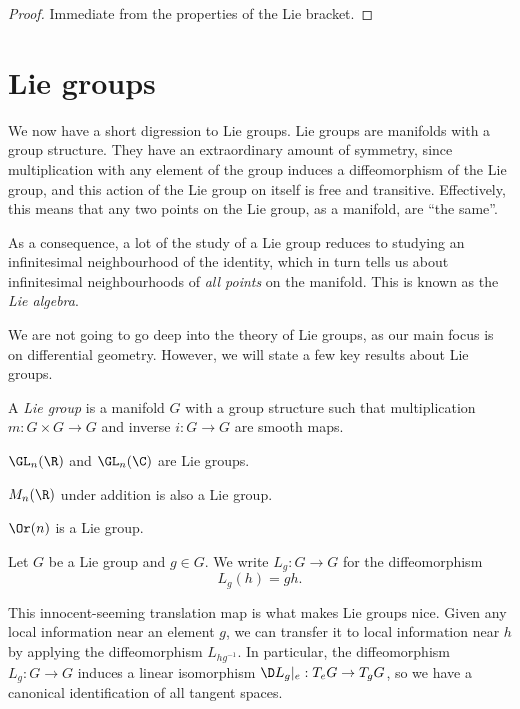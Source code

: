 \documentclass[a4paper]{article}
\begin{document}
\begin{proof}
  Immediate from the properties of the Lie bracket.
\end{proof}

\section{Lie groups}
We now have a short digression to Lie groups. Lie groups are manifolds with a group structure. They have an extraordinary amount of symmetry, since multiplication with any element of the group induces a diffeomorphism of the Lie group, and this action of the Lie group on itself is free and transitive. Effectively, this means that any two points on the Lie group, as a manifold, are ``the same''.

As a consequence, a lot of the study of a Lie group reduces to studying an infinitesimal neighbourhood of the identity, which in turn tells us about infinitesimal neighbourhoods of \emph{all points} on the manifold. This is known as the \emph{Lie algebra}.

We are not going to go deep into the theory of Lie groups, as our main focus is on differential geometry. However, we will state a few key results about Lie groups.

\begin{defi}
  A \emph{Lie group} is a manifold $G$ with a group structure such that multiplication $m: G \times G \to G$ and inverse $i: G \to G$ are smooth maps.
\end{defi}


\begin{eg}
  $\GL_n(\R)$ and $\GL_n(\C)$ are Lie groups.
\end{eg}

\begin{eg}
  $M_n(\R)$ under addition is also a Lie group.
\end{eg}

\begin{eg}
  $\Or(n)$ is a Lie group.
\end{eg}

\begin{notation}
  Let $G$ be a Lie group and $g \in G$. We write $L_g: G \to G$ for the diffeomorphism
  \[
    L_g(h) = gh.
  \]
\end{notation}
This innocent-seeming translation map is what makes Lie groups nice. Given any local information near an element $g$, we can transfer it to local information near $h$ by applying the diffeomorphism $L_{hg^{-1}}$. In particular, the diffeomorphism $L_g: G \to G$ induces a linear isomorphism $\D L_g|_e : T_e G \to T_g G$, so we have a canonical identification of all tangent spaces.
\end{document}
